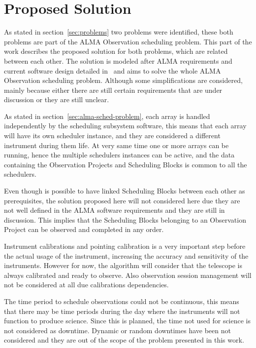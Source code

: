 \chapter{Proposed Solution} 

As stated in section~\ref{sec:problems} two problems were identified, these both problems are part of the ALMA Observation scheduling problem.
This part of the work describes the proposed solution for both problems, which are related between each other.
The solution is modeled after ALMA requirements and current software design detailed in~\cite{avarias11,clarke12,schwarz04,apdm-model} and aims to solve the whole ALMA Observation scheduling problem. Although some simplifications are considered, mainly because either there are still certain requirements that are under discussion or they are still unclear. 

As stated in section~\ref{sec:alma-sched-problem}, each array is handled independently by the scheduling subsystem software, this means that each array will have its own scheduler instance, and they are considered a different instrument during them life. At very same time one or more arrays can be running, hence the multiple schedulers instances can be active, and the data containing the Observation Projects and Scheduling Blocks is common to all the schedulers.

Even though is possible to have linked Scheduling Blocks between each other as prerequisites, the solution proposed here will not considered here due they are not well defined in the ALMA software requirements and they are still in discussion. This implies that the Scheduling Blocks belonging to an Observation Project can be observed and completed in any order.

Instrument calibrations and pointing calibration is a very important step before the actual usage of the instrument, increasing the accuracy and sensitivity of the instruments. However for now, the algorithm will consider that the telescope is always calibrated and ready to observe. Also observation session management will not be considered at all due calibrations dependencies.

The time period to schedule observations could not be continuous, this means that there may be time periods during the day where the instruments will not function to produce science. Since this is planned, the time not used for science is not considered as downtime. Dynamic or random downtimes have been not considered and they are out of the scope of the problem presented in this work.

